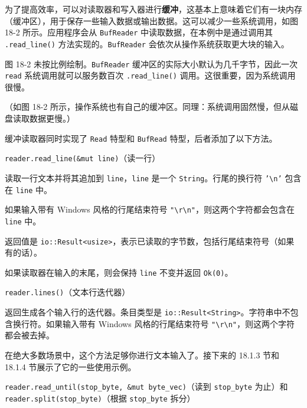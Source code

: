 为了提高效率，可以对读取器和写入器进行\textbf{缓冲}，这基本上意味着它们有一块内存（缓冲区），用于保存一些输入数据或输出数据。这可以减少一些系统调用，如图 18-2 所示。应用程序会从 \texttt{BufReader} 中读取数据，在本例中是通过调用其 \texttt{.read\_line()} 方法实现的。\texttt{BufReader} 会依次从操作系统获取更大块的输入。


图 18-2 未按比例绘制。\texttt{BufReader} 缓冲区的实际大小默认为几千字节，因此一次 \texttt{read} 系统调用就可以服务数百次 \texttt{.read\_line()} 调用。这很重要，因为系统调用很慢。

（如图 18-2 所示，操作系统也有自己的缓冲区。同理：系统调用固然慢，但从磁盘读取数据更慢。）

缓冲读取器同时实现了 \texttt{Read} 特型和 \texttt{BufRead} 特型，后者添加了以下方法。

\begin{myNote}
\texttt{reader.read\_line(\&mut line)}（读一行）
\end{myNote}

读取一行文本并将其追加到 \texttt{line}，\texttt{line} 是一个 \texttt{String}。行尾的换行符 \texttt{'\textbackslash{}n'} 包含在 \texttt{line} 中。

如果输入带有 Windows 风格的行尾结束符号 \texttt{"\textbackslash{}r\textbackslash{}n"}，则这两个字符都会包含在 \texttt{line} 中。

返回值是 \texttt{io::Result<usize>}，表示已读取的字节数，包括行尾结束符号（如果有的话）。

如果读取器在输入的末尾，则会保持 \texttt{line} 不变并返回 \texttt{Ok(0)}。

\begin{mySidenote}
\texttt{reader.lines()}（文本行迭代器）
\end{mySidenote}

返回生成各个输入行的迭代器。条目类型是 \texttt{io::Result<String>}。字符串中不包含换行符。如果输入带有 Windows 风格的行尾结束符号 \texttt{"\textbackslash{}r\textbackslash{}n"}，则这两个字符都会被去掉。

在绝大多数场景中，这个方法足够你进行文本输入了。接下来的 18.1.3 节和 18.1.4 节展示了它的一些使用示例。

\begin{myNote}
\texttt{reader.read\_until(stop\_byte, \&mut byte\_vec)}（读到 \texttt{stop\_byte} 为止）和 \texttt{reader.split(stop\_byte)}（根据 \texttt{stop\_byte} 拆分）
\end{myNote}

